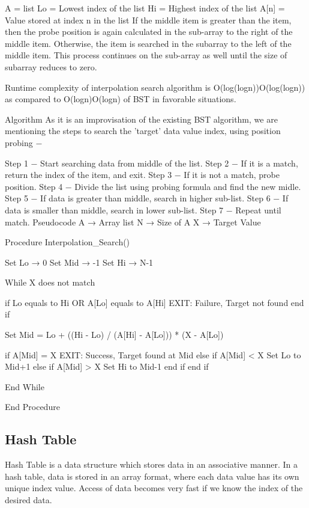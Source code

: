 A = list
Lo = Lowest index of the list
Hi = Highest index of the list
A[n] = Value stored at index n in the list
If the middle item is greater than the item, then the probe position is again calculated in the sub-array to the right of the middle item. Otherwise, the item is searched in the subarray to the left of the middle item. This process continues on the sub-array as well until the size of subarray reduces to zero.

Runtime complexity of interpolation search algorithm is O(log(logn))Ο(log(logn)) as compared to O(logn)Ο(logn) of BST in favorable situations.

Algorithm
As it is an improvisation of the existing BST algorithm, we are mentioning the steps to search the 'target' data value index, using position probing −

Step 1 − Start searching data from middle of the list.
Step 2 − If it is a match, return the index of the item, and exit.
Step 3 − If it is not a match, probe position.
Step 4 − Divide the list using probing formula and find the new midle.
Step 5 − If data is greater than middle, search in higher sub-list.
Step 6 − If data is smaller than middle, search in lower sub-list.
Step 7 − Repeat until match.
Pseudocode
A → Array list
N → Size of A
X → Target Value

Procedure Interpolation_Search()

   Set Lo  →  0
   Set Mid → -1
   Set Hi  →  N-1

   While X does not match

      if Lo equals to Hi OR A[Lo] equals to A[Hi]
         EXIT: Failure, Target not found
      end if

      Set Mid = Lo + ((Hi - Lo) / (A[Hi] - A[Lo])) * (X - A[Lo])

      if A[Mid] = X
         EXIT: Success, Target found at Mid
      else
         if A[Mid] < X
            Set Lo to Mid+1
         else if A[Mid] > X
            Set Hi to Mid-1
         end if
      end if

   End While

End Procedure

\subsection{Hash Table}

Hash Table is a data structure which stores data in an associative manner. In a hash table, data is stored in an array format, where each data value has its own unique index value. Access of data becomes very fast if we know the index of the desired data.

